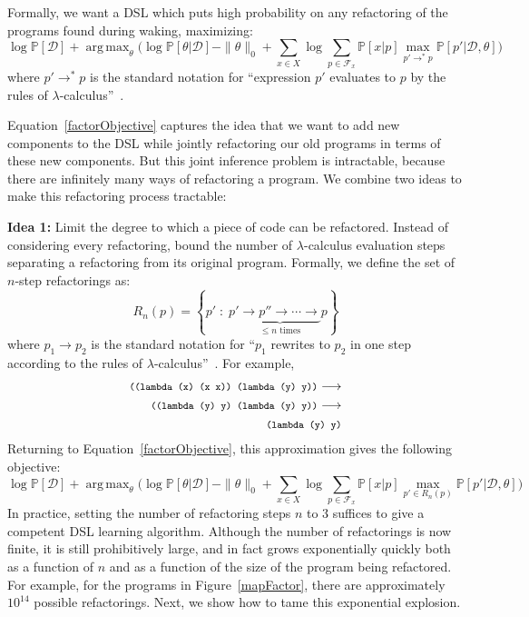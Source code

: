 \documentclass{article}
\newcommand{\code}[1]{{\footnotesize\texttt{#1}}}
\DeclareMathOperator*{\argmax}{arg\,max} %
\newcommand{\probability}{\mathds{P}} %
\newcommand{\reduce}{\longrightarrow}
\newcommand{\manyReduce}{\longrightarrow^*}
\begin{document}
Formally, we want a DSL
which puts high probability on
any refactoring of the programs found during waking, maximizing:
\begin{equation}
        \log \probability[\mathcal{D}] + 
\argmax_{\theta}\Bigg(\log \probability[\theta|\mathcal{D}] - \|\theta\|_0 +\sum_{x\in X}\log \sum_{p\in \mathcal{F}_x}\probability[x|p]\max_{p'\manyReduce p}\probability[p'|\mathcal{D},\theta]\Bigg)
\label{factorObjective}
  \end{equation}
where $p'\manyReduce p$
is the standard notation for ``expression $p'$ evaluates to $p$ by the rules of $\lambda$-calculus''~\cite{pierce}.

Equation~\ref{factorObjective} captures the idea that we want
to add new components to the DSL while jointly refactoring our old
programs in terms of these new components.  But
this joint inference problem is intractable, because there are
infinitely many ways of refactoring a program.
We combine two ideas to make this refactoring process tractable:

\textbf{Idea 1:} Limit the degree to which
a piece of code can be refactored.
Instead of considering every refactoring,
bound the number of $\lambda$-calculus evaluation steps
separating a refactoring from its original program.
Formally,
we define the set of $n$-step refactorings as:
\begin{equation}
  R_n(p) = \left\{p'\;:\;p'\underbrace{\reduce p''\reduce\cdots\reduce}_{\text{$\leq n$ times}} p \right\}
\end{equation}
where $p_1\reduce p_2$ is the standard notation for ``$p_1$ rewrites to $p_2$
in one step according to the rules of $\lambda$-calculus''~\cite{pierce}.
For example,
\begin{align*}
  \code{((lambda (x) (x x)) (lambda (y) y))}\reduce&\\
  \code{((lambda (y) y) (lambda (y) y))}\reduce&\\
  \code{(lambda (y) y)}&
\end{align*}
Returning to Equation~\ref{factorObjective},
this approximation gives the following objective:
\begin{equation}
        \log \probability[\mathcal{D}] + \argmax_{\theta}\Bigg(\log \probability[\theta|\mathcal{D}] - \|\theta\|_0 +\sum_{x\in X}\log \sum_{p\in \mathcal{F}_x}\probability[x|p]\max_{p'\in R_n(p)}\probability[p'|\mathcal{D},\theta]\Bigg)
\label{limitedObjective}
  \end{equation}
In practice, setting the number of refactoring steps $n$ to 3 suffices
to give a competent DSL learning algorithm.  Although the number of
refactorings is now finite, it is still prohibitively large, and in
fact grows exponentially quickly both as a function of $n$ and as a
function of the size of the program being refactored.  For example,
for the programs in Figure~\ref{mapFactor}, there are approximately
$10^{14}$ possible refactorings.  Next, we show how to tame this
exponential explosion.
\end{document}
